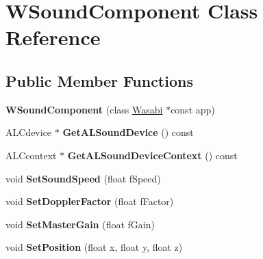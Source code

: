 \hypertarget{class_w_sound_component}{}\section{W\+Sound\+Component Class Reference}
\label{class_w_sound_component}
\subsection*{Public Member Functions}
\begin{DoxyCompactItemize}
\item 
{\bfseries W\+Sound\+Component} (class \hyperlink{class_wasabi}{Wasabi} $\ast$const app)\hypertarget{class_w_sound_component_a601364f1800421c42995f87e05de5cb8}{}\label{class_w_sound_component_a601364f1800421c42995f87e05de5cb8}

\item 
A\+L\+Cdevice $\ast$ {\bfseries Get\+A\+L\+Sound\+Device} () const \hypertarget{class_w_sound_component_acc4d6f87d053ad2a691b6705ddeba899}{}\label{class_w_sound_component_acc4d6f87d053ad2a691b6705ddeba899}

\item 
A\+L\+Ccontext $\ast$ {\bfseries Get\+A\+L\+Sound\+Device\+Context} () const \hypertarget{class_w_sound_component_af36a8bd9d93c7532f72b499f640bd4c3}{}\label{class_w_sound_component_af36a8bd9d93c7532f72b499f640bd4c3}

\item 
void {\bfseries Set\+Sound\+Speed} (float f\+Speed)\hypertarget{class_w_sound_component_a2ae26e81ebdeae4ad7897e883b21bca3}{}\label{class_w_sound_component_a2ae26e81ebdeae4ad7897e883b21bca3}

\item 
void {\bfseries Set\+Doppler\+Factor} (float f\+Factor)\hypertarget{class_w_sound_component_af3eb2dc0ab40f73f964ec9bd5a4ce66a}{}\label{class_w_sound_component_af3eb2dc0ab40f73f964ec9bd5a4ce66a}

\item 
void {\bfseries Set\+Master\+Gain} (float f\+Gain)\hypertarget{class_w_sound_component_a9e1f64dcf8e167756fa1124d28bd3a8a}{}\label{class_w_sound_component_a9e1f64dcf8e167756fa1124d28bd3a8a}

\item 
void {\bfseries Set\+Position} (float x, float y, float z)\hypertarget{class_w_sound_component_a653e30bfd4cb6152085f1eab46651c10}{}\label{class_w_sound_component_a653e30bfd4cb6152085f1eab46651c10}


\end{DoxyCompactItemize}
